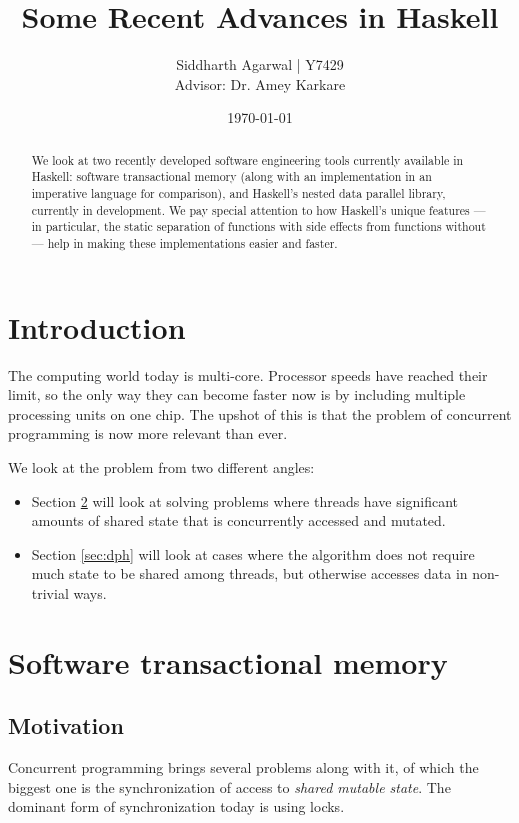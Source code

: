 \documentclass[a4paper]{acmtrans2m}
\title{Some Recent Advances in Haskell}
\author{Siddharth Agarwal | Y7429\\
  Advisor: Dr. Amey Karkare}
\date{\today}
\begin{document}
\maketitle

\tableofcontents

\begin{abstract}
We look at two recently developed software engineering tools currently available
in Haskell: software transactional memory (along with an implementation in an
imperative language for comparison), and Haskell's nested data parallel library,
currently in development. We pay special attention to how Haskell's unique
features --- in particular, the static separation of functions with side effects
from functions without --- help in making these implementations easier and
faster.
\end{abstract}

\section{Introduction}
The computing world today is multi-core. Processor speeds have reached their
limit, so the only way they can become faster now is by including multiple
processing units on one chip. The upshot of this is that the problem of
concurrent programming is now more relevant than ever.

We look at the problem from two different angles:
\begin{itemize}
\item Section \ref{sec:stm} will look at solving problems where threads have
  significant amounts of shared state that is concurrently accessed and mutated.
\item Section \ref{sec:dph} will look at cases where the algorithm does not
  require much state to be shared among threads, but otherwise accesses data in
  non-trivial ways.
\end{itemize}

\section{Software transactional memory}
\label{sec:stm}

\subsection{Motivation}

Concurrent programming brings several problems along with it, of which the
biggest one is the synchronization of access to \textit{shared mutable
  state}. The dominant form of synchronization today is using locks.
\end{document}
